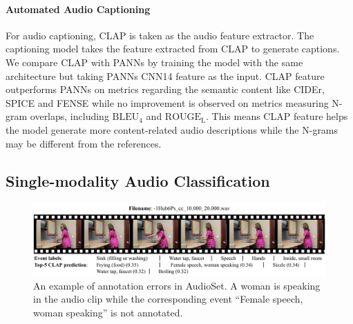 \documentclass[sigconf,anonymous,review]{acmart}
\begin{document}
\paragraph*{Automated Audio Captioning} For audio captioning, CLAP is taken as the audio feature extractor.
The captioning model takes the feature extracted from CLAP to generate captions.
We compare CLAP with PANNs by training the model with the same architecture but taking PANNs CNN14 feature as the input.
CLAP feature outperforms PANNs on metrics regarding the semantic content like CIDEr, SPICE and FENSE while no improvement is observed on metrics measuring N-gram overlaps, including $\text{BLEU}_4$ and $\text{ROUGE}_\text{L}$.
This means CLAP feature helps the model generate more content-related audio descriptions while the N-grams may be different from the references.

\subsection{Single-modality Audio Classification}

\begin{figure}[ht]
    \centering
    \includegraphics[width=\linewidth]{figs/AudioSet_femalespeech_6frame.pdf}
    \caption{An example of annotation errors in AudioSet. A woman is speaking in the audio clip while the corresponding event ``Female speech, woman speaking'' is not annotated.}
    \label{fig:audioset_missing_label}
\end{figure}
\end{document}
